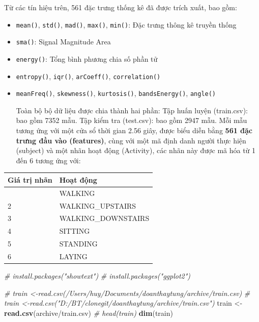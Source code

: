 \documentclass[
]{article}
\newenvironment{Shaded}{\begin{snugshade}}{\end{snugshade}}
\newcommand{\CommentTok}[1]{\textcolor[rgb]{0.56,0.35,0.01}{\textit{#1}}}
\newcommand{\FunctionTok}[1]{\textcolor[rgb]{0.13,0.29,0.53}{\textbf{#1}}}
\newcommand{\NormalTok}[1]{#1}
\newcommand{\OtherTok}[1]{\textcolor[rgb]{0.56,0.35,0.01}{#1}}
\newcommand{\StringTok}[1]{\textcolor[rgb]{0.31,0.60,0.02}{#1}}
\begin{document}
Từ các tín hiệu trên, 561 đặc trưng thống kê đã được trích xuất, bao
gồm:

\begin{itemize}
\item
  \texttt{mean()}, \texttt{std()}, \texttt{mad()}, \texttt{max()},
  \texttt{min()}: Đặc trưng thông kê truyền thống
\item
  \texttt{sma()}: Signal Magnitude Area
\item
  \texttt{energy()}: Tổng bình phương chia số phần tử
\item
  \texttt{entropy()}, \texttt{iqr()}, \texttt{arCoeff()},
  \texttt{correlation()}
\item
  \texttt{meanFreq()}, \texttt{skewness()}, \texttt{kurtosis()},
  \texttt{bandsEnergy()}, \texttt{angle()}

  Toàn bộ bộ dữ liệu được chia thành hai phần: Tập huấn luyện
  (train.csv): bao gồm 7352 mẫu. Tập kiểm tra (test.csv): bao gồm 2947
  mẫu. Mỗi mẫu tương ứng với một cửa sổ thời gian 2.56 giây, được biểu
  diễn bằng \textbf{561 đặc trưng đầu vào (features)}, cùng với một mã
  định danh người thực hiện (subject) và một nhãn hoạt động (Activity),
  các nhãn này được mã hóa từ 1 đến 6 tương ứng với:
\end{itemize}

\begin{longtable}[]{@{}ll@{}}
\toprule\noalign{}
Giá trị nhãn & Hoạt động \\
\midrule\noalign{}
\endhead
\bottomrule\noalign{}
\endlastfoot
1 & WALKING \\
2 & WALKING\_UPSTAIRS \\
3 & WALKING\_DOWNSTAIRS \\
4 & SITTING \\
5 & STANDING \\
6 & LAYING \\
\end{longtable}

\begin{Shaded}
\begin{Highlighting}[]
\CommentTok{\# install.packages("showtext")}
\CommentTok{\# install.packages("ggplot2")}
\end{Highlighting}
\end{Shaded}

\begin{Shaded}
\begin{Highlighting}[]
\CommentTok{\# train \textless{}{-}read.csv(\textquotesingle{}/Users/huy/Documents/doanthaytung/archive/train.csv\textquotesingle{})}
\CommentTok{\# train \textless{}{-}read.csv("D:/BT/clonegit/doanthaytung/archive/train.csv")}
\NormalTok{train }\OtherTok{\textless{}{-}} \FunctionTok{read.csv}\NormalTok{(}\StringTok{\textquotesingle{}archive/train.csv\textquotesingle{}}\NormalTok{)}
\CommentTok{\# head(train)}
\FunctionTok{dim}\NormalTok{(train)}
\end{Highlighting}
\end{Shaded}
\end{document}
